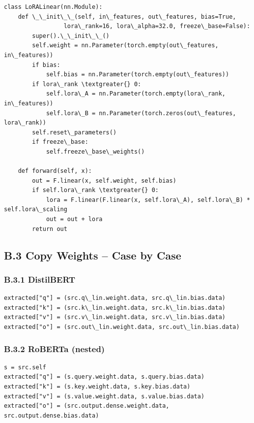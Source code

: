 \begin{lstlisting}
class LoRALinear(nn.Module):
    def \_\_init\_\_(self, in\_features, out\_features, bias=True,
                 lora\_rank=16, lora\_alpha=32.0, freeze\_base=False):
        super().\_\_init\_\_()
        self.weight = nn.Parameter(torch.empty(out\_features, in\_features))
        if bias:
            self.bias = nn.Parameter(torch.empty(out\_features))
        if lora\_rank \textgreater{} 0:
            self.lora\_A = nn.Parameter(torch.empty(lora\_rank, in\_features))
            self.lora\_B = nn.Parameter(torch.zeros(out\_features, lora\_rank))
        self.reset\_parameters()
        if freeze\_base:
            self.freeze\_base\_weights()
    
    def forward(self, x):
        out = F.linear(x, self.weight, self.bias)
        if self.lora\_rank \textgreater{} 0:
            lora = F.linear(F.linear(x, self.lora\_A), self.lora\_B) * self.lora\_scaling
            out = out + lora
        return out
\end{lstlisting}

\subsection{B.3 Copy Weights -- Case by Case}

\subsubsection{B.3.1 DistilBERT}

\begin{lstlisting}
extracted["q"] = (src.q\_lin.weight.data, src.q\_lin.bias.data)
extracted["k"] = (src.k\_lin.weight.data, src.k\_lin.bias.data)
extracted["v"] = (src.v\_lin.weight.data, src.v\_lin.bias.data)
extracted["o"] = (src.out\_lin.weight.data, src.out\_lin.bias.data)
\end{lstlisting}

\subsubsection{B.3.2 RoBERTa (nested)}

\begin{lstlisting}
s = src.self
extracted["q"] = (s.query.weight.data, s.query.bias.data)
extracted["k"] = (s.key.weight.data, s.key.bias.data)
extracted["v"] = (s.value.weight.data, s.value.bias.data)
extracted["o"] = (src.output.dense.weight.data, src.output.dense.bias.data)
\end{lstlisting}

